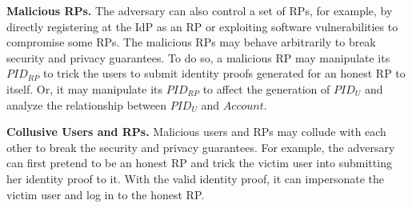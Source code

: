 
\noindent \textbf{Malicious RPs.}
The adversary can also control a set of RPs, for example, by directly registering at the IdP as an RP or exploiting software vulnerabilities to compromise some RPs.
The malicious RPs may behave arbitrarily to break security and privacy guarantees.
To do so, %
a malicious RP may manipulate its $PID_{RP}$ to trick the users to submit identity proofs generated for an honest RP to itself. %
Or, it may manipulate its $PID_{RP}$ to affect the generation of $PID_U$ and analyze the relationship between $PID_U$ and $Account$.

\noindent \textbf{Collusive Users and RPs.} %
Malicious users and RPs may collude with each other %
to break the security and privacy guarantees.
For example, the adversary can first pretend to be an honest RP and trick the victim user into submitting her identity proof to it. With the valid identity proof, it can impersonate the victim user and log in to the honest RP.



